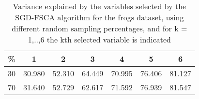 \begin{table}
	\begin{center}
		\begin{tabular}{c c c c c c c}
			\% & 1 & 2 & 3 & 4 & 5 & 6 \\
			\hline
			30 & 30.980 & 52.310 & 64.449 & 70.995 & 76.406 & 81.127 \\
			70 & 31.640 & 52.729 & 62.617 & 71.592 & 76.939 & 81.547 \\
		\end{tabular}
	\end{center}
	\caption{Variance explained by the variables selected by the SGD-FSCA algorithm for the frogs dataset, using different random sampling percentages, and for k = 1,..,6 the kth selected variable is indicated}
\end{table}